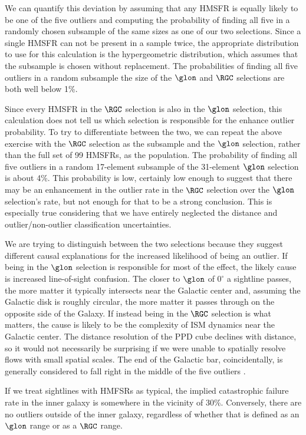 We can quantify this deviation by assuming that any HMSFR is equally likely to be one of the five outliers and computing the probability of finding all five in a randomly chosen subsample of the same sizes as one of our two selections.
Since a single HMSFR can not be present in a sample twice, the appropriate distribution to use for this calculation is the hypergeometric distribution, which assumes that the subsample is chosen without replacement.
The probabilities of finding all five outliers in a random subsample the size of the $\glon$ and $\RGC$ selections are both well below 1\%.

Since every HMSFR in the $\RGC$ selection is also in the $\glon$ selection, this calculation does not tell us which selection is responsible for the enhance outlier probability. 
To try to differentiate between the two, we can repeat the above exercise with the $\RGC$ selection as the subsample and the $\glon$ selection, rather than the full set of 99 HMSFRs, as the population. 
The probability of finding all five outliers in a random 17-element subsample of the 31-element $\glon$ selection is about 4\%. 
This probability is low, certainly low enough to suggest that there may be an enhancement in the outlier rate in the $\RGC$ selection over the $\glon$ selection's rate, but not enough for that to be a strong conclusion.
This is especially true considering that we have entirely neglected the distance and outlier/non-outlier classification uncertainties.

We are trying to distinguish between the two selections because they suggest different causal explanations for the increased likelihood of being an outlier. 
If being in the $\glon$ selection is responsible for most of the effect, the likely cause is increased line-of-sight confusion. 
The closer to $\glon$ of $0^\circ$ a sightline passes, the more matter it typically intersects near the Galactic center and, assuming the Galactic disk is roughly circular, the more matter it passes through on the opposite side of the Galaxy. 
If instead being in the $\RGC$ selection is what matters, the cause is likely to be the complexity of ISM dynamics near the Galactic center.
The distance resolution of the PPD cube declines with distance, so it would not necessarily be surprising if we were unable to spatially resolve flows with small spatial scales.
The end of the Galactic bar, coincidentally, is generally considered to fall right in the middle of the five outliers \cite{2016arXiv160207702B}.

If we treat sightlines with HMFSRs as typical, the implied catastrophic failure rate in the inner galaxy is somewhere in the vicinity of 30\%. 
Conversely, there are no outliers outside of the inner galaxy, regardless of whether that is defined as an $\glon$ range or as a $\RGC$ range.

